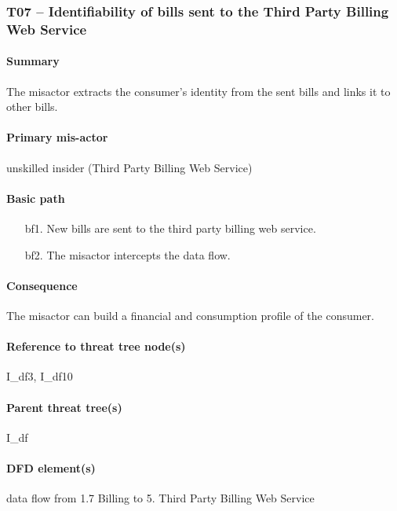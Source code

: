 \subsubsection{T07 -- Identifiability of bills sent to the Third Party Billing Web Service}

\paragraph{Summary} The misactor extracts the consumer's identity from the sent
bills and links it to other bills.

\paragraph{Primary mis-actor} unskilled insider (Third Party Billing Web
Service)

\paragraph{Basic path}
\begin{enumerate}
	\item[bf1.] New bills are sent to the third party billing web service.
	\item[bf2.] The misactor intercepts the data flow.
\end{enumerate}

\paragraph{Consequence} The misactor can build a financial and consumption
profile of the consumer. 

\paragraph{Reference to threat tree node(s)} I\_df3, I\_df10

\paragraph{Parent threat tree(s)} I\_df

\paragraph{DFD element(s)} data flow from 1.7 Billing to 5. Third Party Billing
Web Service

